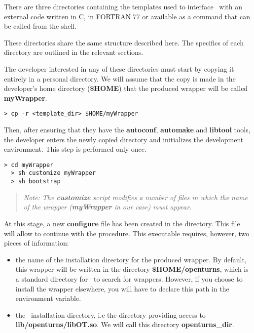 
There are three directories containing the templates used to interface \OT\ with an external code written in C, in FORTRAN 77 or available as a command that can be called from the shell.

These directories share the same structure described here. The specifics of each directory are outlined in the relevant sections.

The developer interested in any of these directories must start by copying it entirely in a personal directory. We will assume that the copy is made in the developer's home directory ({\bf \$HOME}) that the produced wrapper will be called {\bf myWrapper}.
\lstset{language=Bash, basicstyle=\normalsize}
\begin{lstlisting}[frame=TBRL]
  > cp -r <template_dir> $HOME/myWrapper
\end{lstlisting}

Then, after ensuring that they have the {\bf autoconf}, {\bf automake} and {\bf libtool} tools, the developer enters the newly copied directory and initializes the development environment. This step is performed only once.

\lstset{language=Bash, basicstyle=\normalsize}
\begin{lstlisting}[frame=TBRL]
  > cd myWrapper
  > sh customize myWrapper
  > sh bootstrap
\end{lstlisting}

\small
\begin{quote}
  \textit{Note: The {\bf customize} script modifies a number of files in which the name of the wrapper ({\bf myWrapper} in our case) must appear.}
\end{quote}
\normalsize

At this stage, a new {\bf configure} file has been created in the directory. This file will allow to continue with the procedure. This executable requires, however, two pieces of information:
\begin{itemize}
\item the name of the installation directory for the produced wrapper. By default, this wrapper will be written in the directory {\bf \$HOME/openturns}, which is a standard directory for \OT\ to search for wrappers. However, if you choose to install the wrapper elsewhere, you will have to declare this path in the  environment variable.
\item the \OT\ installation directory, i.e the directory providing access to {\bf lib/openturns/libOT.so}. We will call this directory {\bf openturns\_dir}.
\end{itemize}

